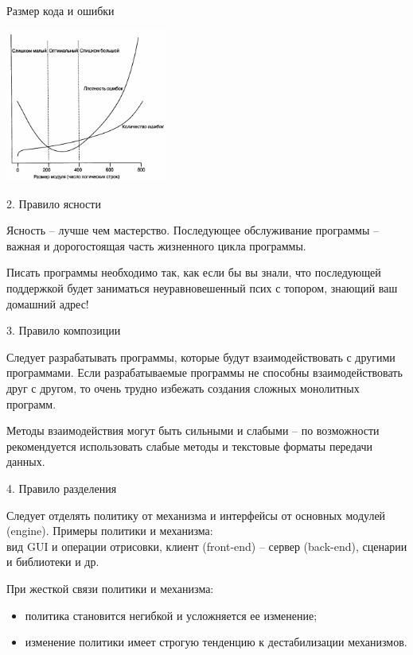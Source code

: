 \begin{frame}{Размер кода и ошибки}
	\begin{center}
		\includegraphics[width=200px]{02-errors_density-graph.png}
	\end{center}
\end{frame}

\begin{frame}{2. Правило ясности}
	\begin{block}{Ясность -- лучше чем мастерство.}
		\pause
		Последующее обслуживание программы -- важная и дорогостоящая часть жизненного цикла программы.
	\end{block}
	\pause
Писать программы необходимо так,  как если бы вы знали,  что последующей поддержкой будет заниматься неуравновешенный псих с топором,  знающий ваш домашний адрес!
\end{frame}

\begin{frame}{3. Правило композиции}
	\begin{block}{Следует разрабатывать программы,  которые будут взаимодействовать с другими программами.}
		\pause
		Если разрабатываемые программы не способны взаимодействовать друг с другом,  то очень трудно избежать создания сложных монолитных  программ.
	\end{block}
	\pause
	Методы взаимодействия могут быть сильными и слабыми -- по возможности рекомендуется использовать слабые методы и текстовые форматы передачи данных.
\end{frame}

\begin{frame}{4. Правило разделения}
	\begin{block}{Следует отделять политику от механизма и интерфейсы от основных модулей (engine).}
		Примеры политики и механизма:\\
		вид GUI и операции отрисовки, клиент (front-end) -- сервер (back-end), сценарии и библиотеки и др.
	\end{block}
	\pause
	При жесткой связи политики и механизма:
	\begin{itemize}
		\item политика становится негибкой и усложняется ее изменение;
		\item изменение политики имеет строгую тенденцию к дестабилизации механизмов.
	\end{itemize}
\end{frame}

